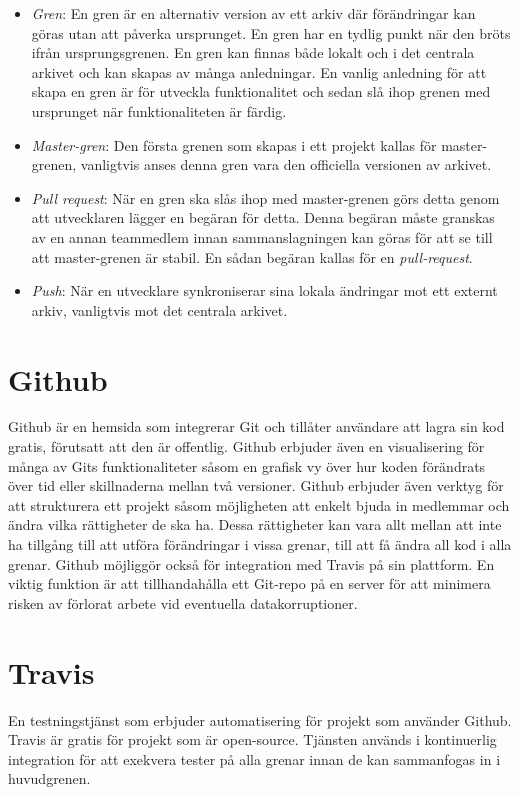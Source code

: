 \begin{itemize}
	\item \textit{Gren}: En gren är en alternativ version av ett arkiv där förändringar kan göras utan att påverka ursprunget. En gren har en tydlig punkt när den bröts ifrån ursprungsgrenen. En gren kan finnas både lokalt och i det centrala arkivet och kan skapas av många anledningar. En vanlig anledning för att skapa en gren är för utveckla funktionalitet och sedan slå ihop grenen med ursprunget när funktionaliteten är färdig.

	\item\textit{Master-gren}: Den första grenen som skapas i ett projekt kallas för master-grenen, vanligtvis anses denna gren vara den officiella versionen av arkivet.

	\item \textit{Pull request}: När en gren ska slås ihop med master-grenen görs detta genom att utvecklaren lägger en begäran för detta. Denna begäran måste granskas av en annan teammedlem innan sammanslagningen kan göras för att se till att master-grenen är stabil. En sådan begäran kallas för en \textit{pull-request}.

	\item \textit{Push}: När en utvecklare synkroniserar sina lokala ändringar mot ett externt arkiv, vanligtvis mot det centrala arkivet.
\end{itemize}


\section{Github}
Github är en hemsida som integrerar Git och tillåter användare att lagra sin kod gratis, förutsatt att den är offentlig. Github erbjuder även en visualisering för många av Gits funktionaliteter såsom en grafisk vy över hur koden förändrats över tid eller skillnaderna mellan två versioner. Github erbjuder även verktyg för att strukturera ett projekt såsom möjligheten att enkelt bjuda in medlemmar och ändra vilka rättigheter de ska ha. Dessa rättigheter kan vara allt mellan att inte ha tillgång till att utföra förändringar i vissa grenar, till att få ändra all kod i alla grenar. Github möjliggör också för integration med Travis på sin plattform. En viktig funktion är att tillhandahålla ett Git-repo på en server för att minimera risken av förlorat arbete vid eventuella datakorruptioner.~\cite{Github}

\section{Travis}
En testningstjänst som erbjuder automatisering för projekt som använder Github. Travis är gratis för projekt som är open-source. Tjänsten används i kontinuerlig integration för att exekvera tester på alla grenar innan de kan sammanfogas in i huvudgrenen.~\cite{Travis}

